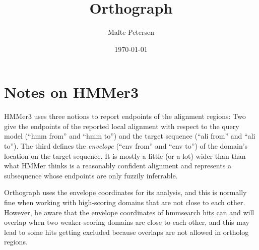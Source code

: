 \documentclass[a4paper]{scrartcl}
\title{Orthograph}
\author{Malte Petersen}
\date{\today}
\begin{document}
\maketitle
\tableofcontents

\section{Notes on HMMer3}

HMMer3 uses three notions to report endpoints of the alignment regions: Two
give the endpoints of the reported local alignment with respect to the query
model (``hmm from'' and ``hmm to'') and the target sequence (``ali from'' and
``ali to''). The third defines the \emph{envelope} (``env from'' and ``env to'')
of the domain's location on the target sequence. It is mostly a little (or a
lot) wider than than what HMMer thinks is a reasonably confident alignment and
represents a subsequence whose endpoints are only fuzzily inferrable.

Orthograph uses the envelope coordinates for its analysis, and this is normally
fine when working with high-scoring domains that are not close to each other.
However, be aware that the envelope coordinates of hmmsearch hits can and will
overlap when two weaker-scoring domains are close to each other, and this may
lead to some hits getting excluded because overlaps are not allowed in ortholog
regions. 
\end{document}

